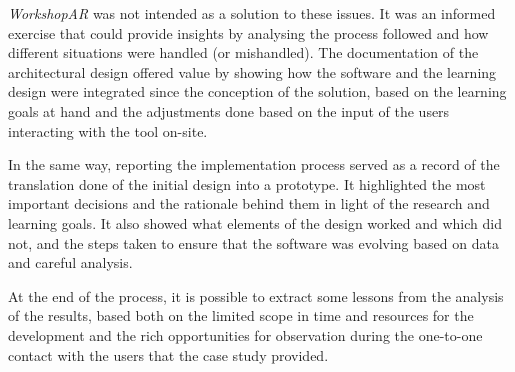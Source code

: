\emph{WorkshopAR} was not intended as a solution to these issues. It was an informed exercise that could provide insights by analysing the process followed and how different situations
were handled (or mishandled). The documentation of the architectural design offered value by showing how the software and the learning design were integrated since the conception of the
solution, based on the learning goals at hand and the adjustments done based on the input of the users interacting with the tool on-site.

In the same way, reporting the implementation process served as a record of the translation done of the initial design into a prototype. It highlighted the most important decisions and
the rationale behind them in light of the research and learning goals. It also showed what elements of the design worked and which did not, and the steps taken to ensure that the software
was evolving based on data and careful analysis.

At the end of the process, it is possible to extract some lessons from the analysis of the results, based both on the limited scope in time and resources for the development and the rich
opportunities for observation during the one-to-one contact with the users that the case study provided.

